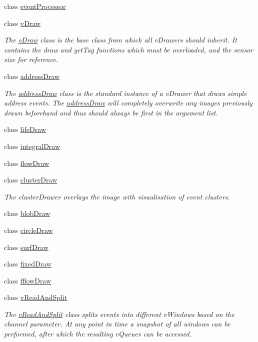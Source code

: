 \begin{DoxyCompactItemize}
class \hyperlink{classemorph_1_1eventProcessor}{event\-Processor}
\item 
class \hyperlink{classemorph_1_1vDraw}{v\-Draw}
\begin{DoxyCompactList}\small\item\em The \hyperlink{classemorph_1_1vDraw}{v\-Draw} class is the base class from which all v\-Drawers should inherit. It contains the draw and get\-Tag functions which must be overloaded, and the sensor size for reference. \end{DoxyCompactList}\item 
class \hyperlink{classemorph_1_1addressDraw}{address\-Draw}
\begin{DoxyCompactList}\small\item\em The \hyperlink{classemorph_1_1addressDraw}{address\-Draw} class is the standard instance of a v\-Drawer that draws simple address events. The \hyperlink{classemorph_1_1addressDraw}{address\-Draw} will completely overwrite any images previously drawn beforehand and thus should always be first in the argument list. \end{DoxyCompactList}\item 
class \hyperlink{classemorph_1_1lifeDraw}{life\-Draw}
\item 
class \hyperlink{classemorph_1_1integralDraw}{integral\-Draw}
\item 
class \hyperlink{classemorph_1_1flowDraw}{flow\-Draw}
\item 
class \hyperlink{classemorph_1_1clusterDraw}{cluster\-Draw}
\begin{DoxyCompactList}\small\item\em The cluster\-Drawer overlays the image with visualisation of event clusters. \end{DoxyCompactList}\item 
class \hyperlink{classemorph_1_1blobDraw}{blob\-Draw}
\item 
class \hyperlink{classemorph_1_1circleDraw}{circle\-Draw}
\item 
class \hyperlink{classemorph_1_1surfDraw}{surf\-Draw}
\item 
class \hyperlink{classemorph_1_1fixedDraw}{fixed\-Draw}
\item 
class \hyperlink{classemorph_1_1fflowDraw}{fflow\-Draw}
\item 
class \hyperlink{classemorph_1_1vReadAndSplit}{v\-Read\-And\-Split}
\begin{DoxyCompactList}\small\item\em The \hyperlink{classemorph_1_1vReadAndSplit}{v\-Read\-And\-Split} class splits events into different v\-Windows based on the channel parameter. At any point in time a snapshot of all windows can be performed, after which the resulting v\-Queues can be accessed. \end{DoxyCompactList}\item 

\end{DoxyCompactItemize}
